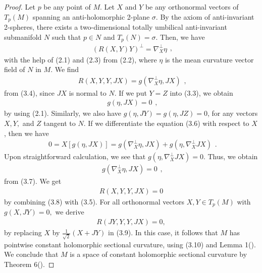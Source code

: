 \documentclass{amsart}
\newtheorem*{theorem A}{Theorem A}
\newtheorem*{theorem B}{N\"olker's Theorem}
\theoremstyle{remark}
\theoremstyle{remark}
\theoremstyle{definition}
\numberwithin{equation}{section}
\begin{document}
\begin{proof}
Let $p$ be any point of $M$. Let $X$ and $Y$  be any orthonormal
vectors of $T_{p}(M)$ spanning an anti-holomorphic 2-plane $\sigma$.
By the axiom of anti-invariant 2-spheres, there exists a
two-dimensional  totally umbilical anti-invariant submanifold $N$
such that $p\in N$ and $T_{p}(N)=\sigma.$ Then,  we have
\begin{equation}
\label{e1}
\begin{array}{c}
(R(X,Y)Y)^{\bot}=\nabla^{\bot}_{X}\eta
\end{array},
\end{equation}
with the help of (2.1) and (2.3) from (2.2), where $\eta$ is the
mean curvature vector field of $N$ in $M$. We find
\begin{equation}
\label{e1}
\begin{array}{c}
R(X,Y,Y,JX)=g(\nabla^{\bot}_{X}\eta,JX)
\end{array},
\end{equation}
from (3.4), since $JX$ is normal to $N.$ If we put $Y=Z$ into (3.3),
we obtain
\begin{equation}
\label{e1}
\begin{array}{c}
g(\eta,JX)=0
\end{array},
\end{equation}
 by using (2.1). Similarly, we also have $g(\eta,JY)=g(\eta,JZ)=0$, for any vectors $X,Y,$ and $Z$ tangent to $N.$
If we differentiate the equation (3.6) with respect to $X$, then we
have
\begin{equation}
\label{e1}
\begin{array}{c}
0=X[g(\eta,JX)]=g(\nabla^{\bot}_{X}\eta,JX)+g(\eta,\nabla^{\bot}_{X}JX)
\end{array}.
\end{equation}
Upon straightforward calculation, we see that
$g(\eta,\nabla^{\bot}_{X}JX)=0.$ Thus, we obtain
\begin{equation}
\label{e1}
\begin{array}{c}
g(\nabla^{\bot}_{X}\eta,JX)=0
\end{array},
\end{equation}
from (3.7). We get
\begin{equation}
\label{e1}
\begin{array}{c}
R(X,Y,Y,JX)=0
\end{array}
\end{equation}
by combining (3.8) with (3.5). For all orthonormal vectors $X,Y\in
T_{p}(M)$ with $g(X,JY)=0,$  we derive
\begin{equation}
\label{e1}
\begin{array}{c}
R(JY,Y,Y,JX)=0,
\end{array}
\end{equation}
by replacing $X$ by $\frac{1}{\sqrt{2}}(X+JY)$ in (3.9). In this
case, it follows that $M$ has pointwise constant holomorphic
sectional curvature, using (3.10) and Lemma 1(\cite{Kas}). We
conclude that $M$ is a space of constant holomorphic sectional
curvature by Theorem 6(\cite{He}).
\end{proof}
\end{document}

